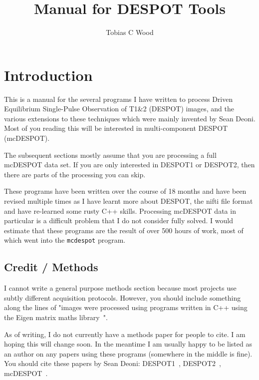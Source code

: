 \documentclass{report}
\begin{document}
\title{Manual for DESPOT Tools}
\author{Tobias C Wood}
\maketitle

\tableofcontents

\chapter{Introduction}

This is a manual for the several programs I have written to process Driven Equilibrium Single-Pulse Observation of T1\&2 (DESPOT) images, and the various extensions to these techniques which were mainly invented by Sean Deoni. Most of you reading this will be interested in multi-component DESPOT (mcDESPOT).

The subsequent sections mostly assume that you are processing a full mcDESPOT data set. If you are only interested in DESPOT1 or DESPOT2, then there are parts of the processing you can skip.

These programs have been written over the course of 18 months and have been revised multiple times as I have learnt more about DESPOT, the nifti file format and have re-learned some rusty C++ skills. Processing mcDESPOT data in particular is a difficult problem that I do not consider fully solved. I would estimate that these programs are the result of over 500 hours of work, most of which went into the \texttt{mcdespot} program.

\section{Credit / Methods}\label{credit}

I cannot write a general purpose methods section because most projects use subtly different acquisition protocols. However, you should include something along the lines of "images were processed using programs written in C++ using the Eigen matrix maths library~\cite{eigenweb}".

As of writing, I do not currently have a methods paper for people to cite. I am hoping this will change soon. In the meantime I am usually happy to be listed as an author on any papers using these programs (somewhere in the middle is fine). You should cite these papers by Sean Deoni: DESPOT1~\cite{Deoni:2007}, DESPOT2~\cite{Deoni:2009a}, mcDESPOT~\cite{Deoni:2008c, Deoni:2012}.
\end{document}
